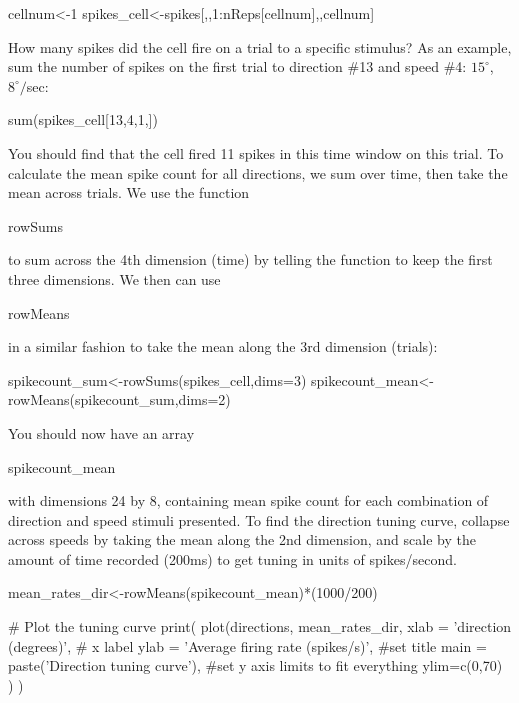 \documentclass[
letterpaper, %
11pt, %
 oneside, 
onecolumn, %
]{memoir}
\numberwithin{Exercise}{chapter}
\begin{document}
\begin{shortrcode}
cellnum<-1
spikes_cell<-spikes[,,1:nReps[cellnum],,cellnum]
\end{shortrcode}   


How many spikes did the cell fire on a trial to a specific stimulus? As an example, sum the number of spikes on the first trial to direction \#13 and speed \#4: $15^{\circ}$, $8^{\circ}/$sec:


\begin{shortrcode}
sum(spikes_cell[13,4,1,])
\end{shortrcode}   


You should find that the cell fired 11 spikes in this time window on this trial. To calculate the mean spike count for all directions, we sum over time, then take the mean across trials. We use the function \begin{ttfamily}rowSums\end{ttfamily} to sum across the 4th dimension (time) by telling the function to keep the first three dimensions. We then can use \begin{ttfamily}rowMeans\end{ttfamily} in a similar fashion to take the mean along the 3rd dimension (trials):

\begin{shortrcode}
spikecount_sum<-rowSums(spikes_cell,dims=3)
spikecount_mean<-rowMeans(spikecount_sum,dims=2)
\end{shortrcode}   

You should now have an array \begin{ttfamily}spikecount\_mean\end{ttfamily} with dimensions 24 by 8, containing mean spike count for each combination of direction and speed stimuli presented. To find the direction tuning curve, collapse across speeds by taking the mean along the 2nd dimension, and scale by the amount of time recorded (200ms) to get tuning in units of spikes/second.

\begin{shortrcode}
mean_rates_dir<-rowMeans(spikecount_mean)*(1000/200) 

# Plot the tuning curve
print(
  plot(directions,  mean_rates_dir,
       xlab = 'direction (degrees)', # x label
       ylab = 'Average firing rate (spikes/s)',
#set title
       main = paste('Direction tuning curve'),
#set y axis limits to fit everything
       ylim=c(0,70)
  )
)
\end{shortrcode}   
\end{document}
